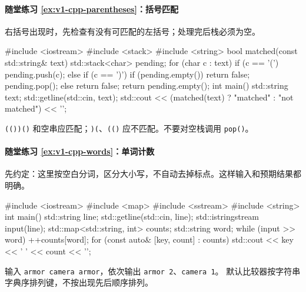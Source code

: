 \paragraph*{随堂练习 \ref{ex:v1-cpp-parentheses}：括号匹配}
\begin{solution}
右括号出现时，先检查有没有可匹配的左括号；处理完后栈必须为空。
\begin{tcpp}
#include <iostream>
#include <stack>
#include <string>
bool matched(const std::string& text) {
    std::stack<char> pending;
    for (char c : text) {
        if (c == '(') {
            pending.push(c);
        } else if (c == ')') {
            if (pending.empty()) return false;
            pending.pop();
        } else {
            return false;
        }
    }
    return pending.empty();
}
int main() {
    std::string text;
    std::getline(std::cin, text);
    std::cout << (matched(text) ? "matched" : "not matched") << '\n';
}
\end{tcpp}
\texttt{(())()} 和空串应匹配；\texttt{)(}、\texttt{(()} 应不匹配。不要对空栈调用 \texttt{pop()}。
\end{solution}

\paragraph*{随堂练习 \ref{ex:v1-cpp-words}：单词计数}
\begin{solution}
先约定：这里按空白分词，区分大小写，不自动去掉标点。这样输入和预期结果都明确。
\begin{tcpp}
#include <iostream>
#include <map>
#include <sstream>
#include <string>
int main() {
    std::string line;
    std::getline(std::cin, line);
    std::istringstream input(line);
    std::map<std::string, int> counts;
    std::string word;
    while (input >> word) ++counts[word];
    for (const auto& [key, count] : counts) {
        std::cout << key << ' ' << count << '\n';
    }
}
\end{tcpp}
输入 \texttt{armor camera armor}，依次输出 \texttt{armor 2}、\texttt{camera 1}。
默认比较器按字符串字典序排列键，不按出现先后顺序排列。
\end{solution}

